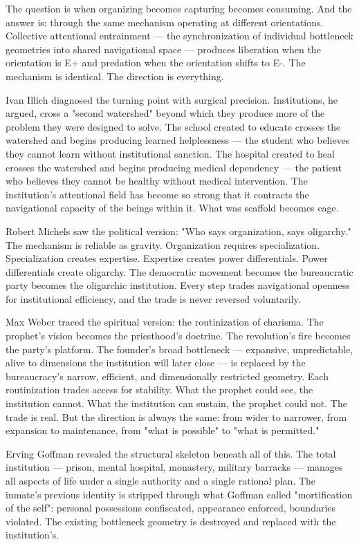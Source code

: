 The question is when organizing becomes capturing becomes consuming. And the answer is: through the same mechanism operating at different orientations. Collective attentional entrainment — the synchronization of individual bottleneck geometries into shared navigational space — produces liberation when the orientation is E+ and predation when the orientation shifts to E-. The mechanism is identical. The direction is everything.


Ivan Illich diagnosed the turning point with surgical precision. Institutions, he argued, cross a "second watershed" beyond which they produce more of the problem they were designed to solve. The school created to educate crosses the watershed and begins producing learned helplessness — the student who believes they cannot learn without institutional sanction. The hospital created to heal crosses the watershed and begins producing medical dependency — the patient who believes they cannot be healthy without medical intervention. The institution's attentional field has become so strong that it contracts the navigational capacity of the beings within it. What was scaffold becomes cage.


Robert Michels saw the political version: "Who says organization, says oligarchy." The mechanism is reliable as gravity. Organization requires specialization. Specialization creates expertise. Expertise creates power differentials. Power differentials create oligarchy. The democratic movement becomes the bureaucratic party becomes the oligarchic institution. Every step trades navigational openness for institutional efficiency, and the trade is never reversed voluntarily.


Max Weber traced the spiritual version: the routinization of charisma. The prophet's vision becomes the priesthood's doctrine. The revolution's fire becomes the party's platform. The founder's broad bottleneck — expansive, unpredictable, alive to dimensions the institution will later close — is replaced by the bureaucracy's narrow, efficient, and dimensionally restricted geometry. Each routinization trades access for stability. What the prophet could see, the institution cannot. What the institution can sustain, the prophet could not. The trade is real. But the direction is always the same: from wider to narrower, from expansion to maintenance, from "what is possible" to "what is permitted."


Erving Goffman revealed the structural skeleton beneath all of this. The total institution — prison, mental hospital, monastery, military barracks — manages all aspects of life under a single authority and a single rational plan. The inmate's previous identity is stripped through what Goffman called "mortification of the self": personal possessions confiscated, appearance enforced, boundaries violated. The existing bottleneck geometry is destroyed and replaced with the institution's.


